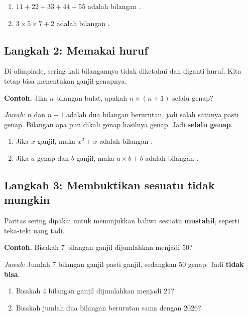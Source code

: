 \documentclass[11pt,a4paper]{article}
\begin{document}
\begin{giliranmu}
\begin{enumerate}[label=\alph*.]
    \item $11 + 22 + 33 + 44 + 55$ adalah bilangan \kosong.
    \item $3 \times 5 \times 7 + 2$ adalah bilangan \kosong.
\end{enumerate}
\end{giliranmu}

\subsection*{Langkah 2: Memakai huruf}
Di olimpiade, sering kali bilangannya tidak diketahui dan diganti huruf. Kita tetap bisa
menentukan ganjil-genapnya.

\begin{contoh}
\textbf{Contoh.} Jika $n$ bilangan bulat, apakah $n \times (n+1)$ selalu genap?

\textit{Jawab:} $n$ dan $n+1$ adalah dua bilangan berurutan, jadi salah satunya pasti genap.
Bilangan apa pun dikali genap hasilnya genap. Jadi \textbf{selalu genap}.
\end{contoh}

\begin{giliranmu}
\begin{enumerate}[label=\alph*.]
    \item Jika $x$ ganjil, maka $x^2 + x$ adalah bilangan \kosong.
    \item Jika $a$ genap dan $b$ ganjil, maka $a \times b + b$ adalah bilangan \kosong.
\end{enumerate}
\end{giliranmu}

\subsection*{Langkah 3: Membuktikan sesuatu tidak mungkin}
Paritas sering dipakai untuk menunjukkan bahwa sesuatu \textbf{mustahil}, seperti teka-teki
uang tadi.

\begin{contoh}
\textbf{Contoh.} Bisakah 7 bilangan ganjil dijumlahkan menjadi 50?

\textit{Jawab:} Jumlah 7 bilangan ganjil pasti ganjil, sedangkan 50 genap. Jadi \textbf{tidak bisa}.
\end{contoh}

\begin{giliranmu}
\begin{enumerate}[label=\alph*.]
    \item Bisakah 4 bilangan ganjil dijumlahkan menjadi 21? \kosong
    \item Bisakah jumlah dua bilangan berurutan sama dengan 2026? \kosong
\end{enumerate}
\end{giliranmu}
\end{document}
